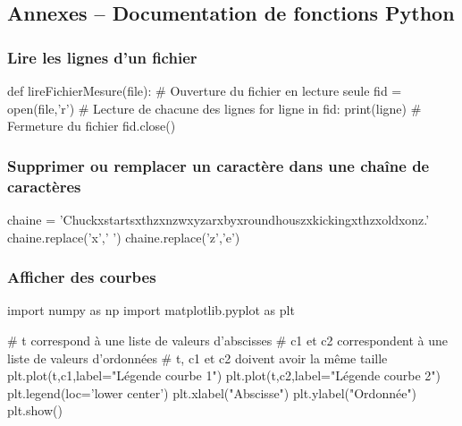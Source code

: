 \documentclass[10pt]{article}
\begin{document}
\subsection*{Annexes -- Documentation de fonctions Python}

\subsubsection*{Lire les lignes d'un fichier}
\begin{py}
\begin{python}
def lireFichierMesure(file):
    # Ouverture du fichier en lecture seule
    fid = open(file,'r')
    # Lecture de chacune des lignes
    for ligne in fid:
        print(ligne)
    # Fermeture du fichier        
    fid.close()
\end{python}
\end{py}


\subsubsection*{Supprimer ou remplacer un caractère dans une chaîne de caractères}
\begin{py}
\begin{python}
chaine = 'Chuckxstartsxthzxnzwxyzarxbyxroundhouszxkickingxthzxoldxonz.'
chaine.replace('x',' ')
chaine.replace('z','e')
\end{python}
\end{py}

\subsubsection*{Afficher des courbes}
\begin{py}
\begin{python}
import numpy as np
import matplotlib.pyplot as plt

# t correspond à une liste de valeurs d'abscisses
# c1 et c2 correspondent à une liste de valeurs d'ordonnées
# t, c1 et c2 doivent avoir la même taille
plt.plot(t,c1,label="Légende courbe 1")
plt.plot(t,c2,label="Légende courbe 2")
plt.legend(loc='lower center')
plt.xlabel("Abscisse")
plt.ylabel("Ordonnée")
plt.show()

\end{python}
\end{py}
\end{document}
